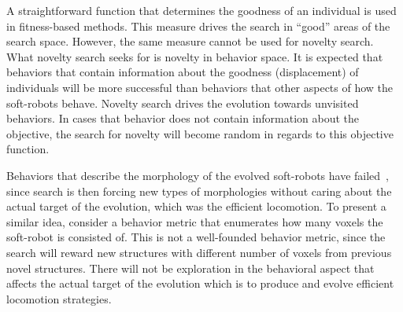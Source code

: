 A straightforward function that determines the goodness of an individual is used in fitness-based methods. This measure drives the search in ``good'' areas of the search space. However, the same measure cannot be used for novelty search. What novelty search seeks for is novelty in behavior space. It is expected that behaviors that contain information about the goodness (displacement) of individuals will be more successful than behaviors that other aspects of how the soft-robots behave. Novelty search drives the evolution towards unvisited behaviors. In cases that behavior does not contain information about the objective, the search for novelty will become random in regards to this objective function.

Behaviors that describe the morphology of the evolved soft-robots have failed~\citep{lehman2011evolving}, since search is then forcing new types of morphologies without caring about the actual target of the evolution, which was the efficient locomotion. To present a similar idea, consider a behavior metric that enumerates how many voxels the soft-robot is consisted of. This is not a well-founded behavior metric, since the search will reward new structures with different number of voxels from previous novel structures. There will not be exploration in the behavioral aspect that affects the actual target of the evolution which is to produce and evolve efficient locomotion strategies. 

